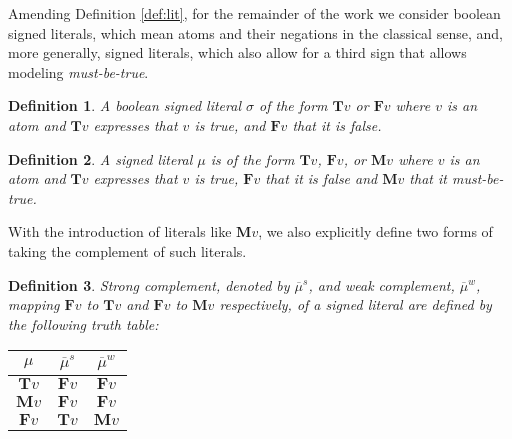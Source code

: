 \documentclass{vutinfth} %
\newtheorem{definition}{Definition}[chapter]
\newcommand{\mbt}{must-be-true\xspace}
\newcommand{\negstrong}[1]{\overline{#1}^s}
\newcommand{\negweak}[1]{\overline{#1}^w}
\newcommand{\bT}{\mathbf{T}}
\newcommand{\bM}{\mathbf{M}}
\newcommand{\bF}{\mathbf{F}}
\newcommand{\sgl}{\mu}
\newcommand{\bsgl}{\sigma}
\newcommand{\wkn}{\textit{weaken}}
\begin{document}
Amending Definition \ref{def:lit}, for the remainder of the work we consider boolean signed literals, which mean atoms and their negations in the classical sense, and, more generally, signed literals, which also allow for a third sign that allows modeling \emph{\mbt}.

\begin{definition}
A \emph{boolean signed literal} $\bsgl$ of the form $\bT v$ or $\bF v$ where $v$ is an atom and $\bT v$ expresses that $v$ is \emph{true}, and $\bF v$ that it is \emph{false}.
\end{definition}

\begin{definition}
A \emph{signed literal} $\sgl$ is of the form $\bT v$, $\bF v$, or $\bM v$ where $v$ is an atom and $\bT v$ expresses that $v$ is \emph{true}, $\bF v$ that it is \emph{false} and $\bM v$ that it \emph{\mbt}.
\end{definition}



With the introduction of literals like $\bM v$, we also explicitly define two forms of taking the complement of such literals.

\begin{definition}
Strong complement, denoted by $\negstrong{\sgl}$, and weak complement, $\negweak{\sgl}$, mapping $\bF v$ to $\bT v$ and $\bF v$ to $\bM v$ respectively, of a signed literal are defined by the following truth table:%

\begin{center}
\begin{tabular}{|c|cc|}
\hline
$\sgl$&$\negstrong{\sgl}$&$\negweak{\sgl}$\\
\hline
\hline
$\bT v$&$\bF v$&$\bF v$\\
$\bM v$&$\bF v$&$\bF v$\\
$\bF v$&$\bT v$&$\bM v$\\
\hline
\end{tabular}
\end{center}
\end{definition}
\end{document}
